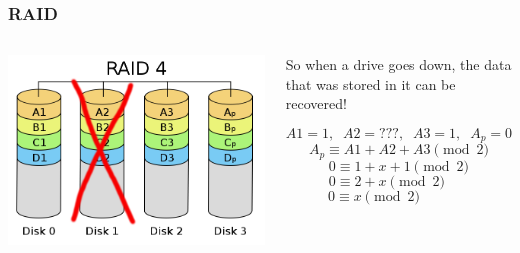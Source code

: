 \documentclass{beamer}
\theoremstyle{mystyle}
\begin{document}

\begin{frame}
\frametitle{RAID}

\begin{columns}
		\begin{center}
			\vspace{-1in}
			\includegraphics[scale=0.15]{disk1}	
		\end{center}
		\begin{center}
			So when a drive goes down, the data that was stored in it can be recovered! 
		
			\[A1 = 1, \; \; A2 = ???, \; \; A3 = 1, \;\; A_p =  0\]
		    \pause \[ A_p \equiv A1 + A2 + A3 \pmod 2 \]
		    \vspace*{-\baselineskip}\pause\[ 0 \equiv 1 + x + 1 \pmod2 \]
		    \vspace*{-\baselineskip}\pause\[ \; 0 \equiv 2 + x \pmod 2 \quad \quad \]
		   \vspace*{-\baselineskip}\pause \[ 0 \equiv x \pmod 2 \quad \quad \quad \;\; \]
		\end{center}
\end{columns}
 
\end{frame}

\end{document}
